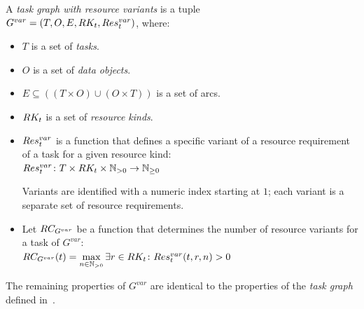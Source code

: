 \vspace{2mm} A
\emph{task graph with resource variants} is a tuple \\
$G^{var} = (T, O, E, RK_t, Res_t^{var})$, where:
\begin{itemize}[itemsep=0pt]
	\item $T$ is a set of \emph{tasks}.
	\item $O$ is a set of \emph{data objects}.
	\item $E \subseteq ((T\times{}O) \cup (O\times{}T))$ is a set of arcs.
	\item $RK_t$ is a set of \emph{resource kinds}.
	\item $Res_t^{var}$ is a function that defines a specific variant of a resource
	      requirement of a task for a given resource kind: \\ $Res_t^{var}\colon T \times RK_t \times
		      \mathbb{N}_{>0} \rightarrow
		      \mathbb{N}_{\geq{}0}$

	Variants are identified with a numeric index starting at $1$; each variant is a separate
	set of resource requirements.
	\item Let $RC_{G^{var}}$ be a function that determines the number of
	resource variants for a task of $G^{var}$: \\
	$RC_{G^{var}}(t) = \max\limits_{n\in\mathbb{N}_{>0}} \exists
		      r\in RK_t\colon Res_t^{var}(t, r, n) > 0$
\end{itemize}

The remaining properties of $G^{var}$ are identical to the properties of the
\emph{task graph} defined in~.


